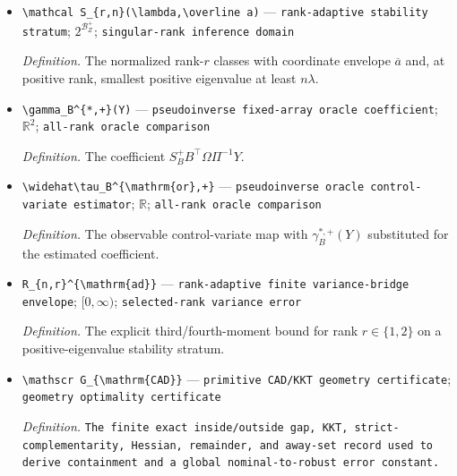 \documentclass{article}
\begin{document}
\begin{itemize}
  \item \texttt{\textbackslash{}\allowbreak{}mathcal S\_\allowbreak{}\{r,\allowbreak{}n\}\allowbreak{}(\textbackslash{}\allowbreak{}lambda,\allowbreak{}\textbackslash{}\allowbreak{}overline a)} --- \texttt{rank-\allowbreak{}adaptive stability stratum}; \(2^{\mathcal B_Z^+}\); \texttt{singular-\allowbreak{}rank inference domain}
  \par\smallskip\noindent\emph{Definition.} The normalized rank-\(r\) classes with coordinate envelope \(\overline a\) and, at positive rank, smallest positive eigenvalue at least \(n\lambda\).
  \item \texttt{\textbackslash{}\allowbreak{}gamma\_\allowbreak{}B\textasciicircum{}\{*,\allowbreak{}+\allowbreak{}\}\allowbreak{}(Y)} --- \texttt{pseudoinverse fixed-\allowbreak{}array oracle coefficient}; \(\mathbb R^2\); \texttt{all-\allowbreak{}rank oracle comparison}
  \par\smallskip\noindent\emph{Definition.} The coefficient \(S_B^+B^{\top}\Omega\Pi^{-1}Y\).
  \item \texttt{\textbackslash{}\allowbreak{}widehat\textbackslash{}\allowbreak{}tau\_\allowbreak{}B\textasciicircum{}\{\textbackslash{}\allowbreak{}mathrm\{or\}\allowbreak{},\allowbreak{}+\allowbreak{}\}\allowbreak{}} --- \texttt{pseudoinverse oracle control-\allowbreak{}variate estimator}; \(\mathbb R\); \texttt{all-\allowbreak{}rank oracle comparison}
  \par\smallskip\noindent\emph{Definition.} The observable control-variate map with \(\gamma_B^{*,+}(Y)\) substituted for the estimated coefficient.
  \item \texttt{R\_\allowbreak{}\{n,\allowbreak{}r\}\allowbreak{}\textasciicircum{}\{\textbackslash{}\allowbreak{}mathrm\{ad\}\allowbreak{}\}\allowbreak{}} --- \texttt{rank-\allowbreak{}adaptive finite variance-\allowbreak{}bridge envelope}; \([0,\infty)\); \texttt{selected-\allowbreak{}rank variance error}
  \par\smallskip\noindent\emph{Definition.} The explicit third/fourth-moment bound for rank \(r\in\{1,2\}\) on a positive-eigenvalue stability stratum.
  \item \texttt{\textbackslash{}\allowbreak{}mathscr G\_\allowbreak{}\{\textbackslash{}\allowbreak{}mathrm\{CAD\}\allowbreak{}\}\allowbreak{}} --- \texttt{primitive CAD/\allowbreak{}KKT geometry certificate}; \texttt{geometry optimality certificate}
  \par\smallskip\noindent\emph{Definition.} \texttt{The finite exact inside/\allowbreak{}outside gap,\allowbreak{} KKT,\allowbreak{} strict-\allowbreak{}complementarity,\allowbreak{} Hessian,\allowbreak{} remainder,\allowbreak{} and away-\allowbreak{}set record used to derive containment and a global nominal-\allowbreak{}to-\allowbreak{}robust error constant.}

\end{itemize}
\end{document}
